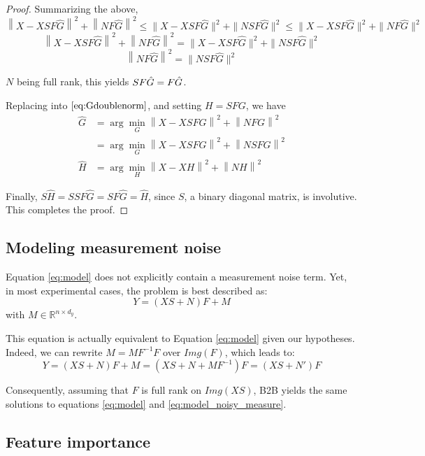 \begin{proof}
Summarizing the above,
$$\left \| X - XSF\hat G\right\| ^2  + \left \| NF\hat G\right \| ^2 \leq \| X - XSF\hat G \| ^2  + \| NSF\hat G \| ^2 \leq \| X - XSF\hat G \| ^2  + \| NF\hat G \| ^2$$
$$\left \| X - XSF\hat G\right\| ^2  + \left \| NF\hat G\right \| ^2 = \| X - XSF\hat G \| ^2  + \| NSF\hat G \| ^2$$
$$\left \| NF\hat G\right \| ^2 =  \| NSF\hat G \| ^2$$

$N$ being full rank, this yields $SF\hat G = F\Hat G$.

Replacing into $\eqref{eq:Gdoublenorm}$, and setting $H = SFG$, we have
\begin{align*}
	\hat G &=  \arg \min_G  \left \| X - XSFG\right \| ^2  + \left \| NFG\right \| ^2 \\
	&=   \arg \min_G \left \| X - XSFG\right \| ^2  + \left \| NSFG\right \| ^2 \\
	\hat H &=  \arg \min_H \left \| X - XH\right \| ^2  + \left \| NH\right \| ^2
	\label{eq:4}
\end{align*}

Finally, $S\hat H = S SF\hat G = SF\hat G = \hat H$, since $S$, a binary
diagonal matrix, is involutive. This completes the proof.
\end{proof}



\newpage
\subsection{Modeling measurement noise}

Equation \ref{eq:model} does not explicitly contain a measurement noise term.
Yet, in most experimental cases, the problem is best described as:
\begin{equation}
  Y = (XS+N)F+M
  \label{eq:model_noisy_measure}
\end{equation}
  with $M\in \mathbb{R}^{n \times d_y}$.

This equation is actually equivalent to Equation \ref{eq:model} given our
hypotheses. Indeed, we can rewrite $M = MF^{-1}F$ over $Img(F)$, which leads to:
$$Y = (XS+N)F+M = (XS+N+MF^{-1})F = (XS+N')F$$

Consequently, assuming that $F$ is full rank on $Img(XS)$, B2B yields the same
solutions to equations \ref{eq:model} and \ref{eq:model_noisy_measure}.


\subsection{Feature importance}
\label{appendix:feature_importance}


